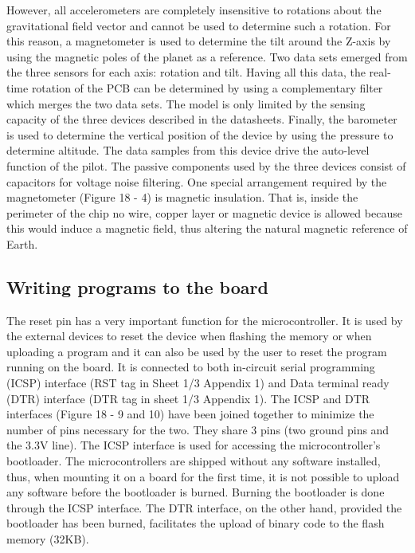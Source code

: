 \documentclass{IEEEtran}
\begin{document}
However, all accelerometers are completely insensitive to rotations about the gravitational field vector and cannot be used to determine such a rotation. For this reason, a magnetometer is used to determine the tilt around the Z-axis by using the magnetic poles of the planet as a reference.
\newline
\newline
Two data sets emerged from the three sensors for each axis: rotation and tilt. Having all this data, the real-time rotation of the PCB can be determined by using a complementary filter which merges the two data sets. The model is only limited by the sensing capacity of the three devices described in the datasheets.
\newline
\newline
Finally, the barometer is used to determine the vertical position of the device by using the pressure to determine altitude. The data samples from this device drive the auto-level function of the pilot.
\newline
\newline
The passive components used by the three devices consist of capacitors for voltage noise filtering. One special arrangement required by the magnetometer (Figure 18 - 4) is magnetic insulation. That is, inside the perimeter of the chip no wire, copper layer or magnetic device is allowed because this would induce a magnetic field, thus altering the natural magnetic reference of Earth.
\subsection*{Writing programs to the board}
The reset pin has a very important function for the microcontroller. It is used by the external devices to reset the device when flashing the memory or when uploading a program and it can also be used by the user to reset the program running on the board. It is connected to both in-circuit serial programming (ICSP) interface (RST tag in Sheet 1/3 Appendix 1) and Data terminal ready (DTR) interface (DTR tag in sheet 1/3 Appendix 1).
\newline
\newline
The ICSP and DTR interfaces (Figure 18 - 9 and 10) have been joined together to minimize the number of pins necessary for the two. They share 3 pins (two ground pins and the 3.3V line). The ICSP interface is used for accessing the microcontroller's bootloader. The microcontrollers are shipped without any software installed, thus, when mounting it on a board for the first time, it is not possible to upload any software before the bootloader is burned. Burning the bootloader is done through the ICSP interface. The DTR interface, on the other hand, provided the bootloader has been burned, facilitates the upload of binary code to the flash memory (32KB).
\end{document}
